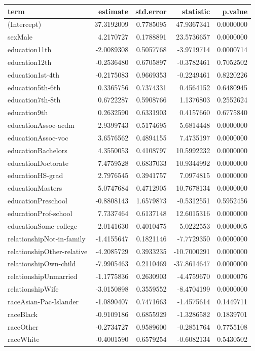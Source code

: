 \documentclass[]{article}
\begin{document}
\begin{table}[H]
\centering
\begin{tabular}{l|r|r|r|r}
\hline
term & estimate & std.error & statistic & p.value\\
\hline
(Intercept) & 37.3192009 & 0.7785095 & 47.9367341 & 0.0000000\\
\hline
sexMale & 4.2170727 & 0.1788891 & 23.5736657 & 0.0000000\\
\hline
education11th & -2.0089308 & 0.5057768 & -3.9719714 & 0.0000714\\
\hline
education12th & -0.2536480 & 0.6705897 & -0.3782461 & 0.7052502\\
\hline
education1st-4th & -0.2175083 & 0.9669353 & -0.2249461 & 0.8220226\\
\hline
education5th-6th & 0.3365756 & 0.7374331 & 0.4564152 & 0.6480945\\
\hline
education7th-8th & 0.6722287 & 0.5908766 & 1.1376803 & 0.2552624\\
\hline
education9th & 0.2632590 & 0.6331903 & 0.4157660 & 0.6775840\\
\hline
educationAssoc-acdm & 2.9399743 & 0.5174695 & 5.6814448 & 0.0000000\\
\hline
educationAssoc-voc & 3.6576562 & 0.4894155 & 7.4735197 & 0.0000000\\
\hline
educationBachelors & 4.3550053 & 0.4108797 & 10.5992232 & 0.0000000\\
\hline
educationDoctorate & 7.4759528 & 0.6837033 & 10.9344992 & 0.0000000\\
\hline
educationHS-grad & 2.7976545 & 0.3941757 & 7.0974815 & 0.0000000\\
\hline
educationMasters & 5.0747684 & 0.4712905 & 10.7678134 & 0.0000000\\
\hline
educationPreschool & -0.8808143 & 1.6579873 & -0.5312551 & 0.5952456\\
\hline
educationProf-school & 7.7337464 & 0.6137148 & 12.6015316 & 0.0000000\\
\hline
educationSome-college & 2.0141630 & 0.4010475 & 5.0222553 & 0.0000005\\
\hline
relationshipNot-in-family & -1.4155647 & 0.1821146 & -7.7729350 & 0.0000000\\
\hline
relationshipOther-relative & -4.2085729 & 0.3933235 & -10.7000291 & 0.0000000\\
\hline
relationshipOwn-child & -7.9905463 & 0.2110469 & -37.8614647 & 0.0000000\\
\hline
relationshipUnmarried & -1.1775836 & 0.2630903 & -4.4759670 & 0.0000076\\
\hline
relationshipWife & -3.0150898 & 0.3559552 & -8.4704199 & 0.0000000\\
\hline
raceAsian-Pac-Islander & -1.0890407 & 0.7471663 & -1.4575614 & 0.1449711\\
\hline
raceBlack & -0.9109186 & 0.6855929 & -1.3286582 & 0.1839701\\
\hline
raceOther & -0.2734727 & 0.9589600 & -0.2851764 & 0.7755108\\
\hline
raceWhite & -0.4001590 & 0.6579254 & -0.6082134 & 0.5430502\\
\hline
\end{tabular}
\end{table}
\end{document}
